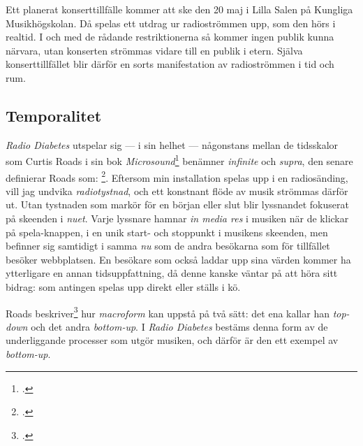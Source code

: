 \documentclass[11pt, a4paper]{article} %
\begin{document}
Ett planerat konserttillfälle kommer att ske den 20 maj i Lilla Salen på Kungliga Musikhögskolan. Då spelas ett utdrag ur radioströmmen upp, som den hörs i realtid. I och med de rådande restriktionerna så kommer ingen publik kunna närvara, utan konserten strömmas vidare till en publik i etern. Själva konserttillfället blir därför en sorts manifestation av radioströmmen i tid och rum.


\subsection*{Temporalitet}
\emph{Radio Diabetes} utspelar sig --- i sin helhet --- någonstans mellan de tidsskalor som Curtis Roads i sin bok \emph{Microsound}\footcite{roads_microsound_2004} benämner \emph{infinite} och \emph{supra}, den senare definierar Roads som: \footcite[3]{roads_microsound_2004}. Eftersom min installation spelas upp i en radiosänding, vill jag undvika \emph{radiotystnad}, och ett konstnant flöde av musik strömmas därför ut. Utan tystnaden som markör för en början eller slut blir lyssnandet fokuserat på skeenden i \emph{nuet}. Varje lyssnare hamnar \emph{in media res} i musiken när de klickar på spela-knappen, i en unik start- och stoppunkt i musikens skeenden, men befinner sig samtidigt i samma \emph{nu} som de andra besökarna som för tillfället besöker webbplatsen. En besökare som också laddar upp sina värden kommer ha ytterligare en annan tidsuppfattning, då denne kanske väntar på att höra sitt bidrag: som antingen spelas upp direkt eller ställs i kö.

Roads beskriver\footcite[13]{roads_microsound_2004} hur \emph{macroform} kan uppstå på två sätt: det ena kallar han \emph{top-down} och det andra \emph{bottom-up}. I \emph{Radio Diabetes} bestäms denna form av de underliggande processer som utgör musiken, och därför är den ett exempel av \emph{bottom-up}. 
\end{document}
